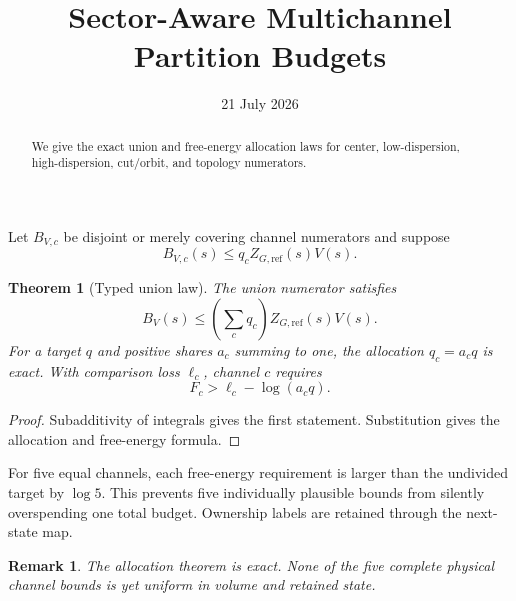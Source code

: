 \documentclass[11pt]{article}\usepackage[margin=1in]{geometry}\usepackage{amsmath,amsthm}\newtheorem{theorem}{Theorem}\newtheorem{remark}{Remark}
\title{Sector-Aware Multichannel Partition Budgets}\author{}\date{21 July 2026}
\begin{document}
\maketitle
\begin{abstract}We give the exact union and free-energy allocation laws for center, low-dispersion, high-dispersion, cut/orbit, and topology numerators.\end{abstract}
Let $B_{V,c}$ be disjoint or merely covering channel numerators and suppose
\[B_{V,c}(s)\le q_c Z_{G,\mathrm{ref}}(s)V(s).
\]
\begin{theorem}[Typed union law]The union numerator satisfies
\[B_V(s)\le\left(\sum_cq_c\right)Z_{G,\mathrm{ref}}(s)V(s).
\]
For a target $q$ and positive shares $a_c$ summing to one, the allocation $q_c=a_cq$ is exact. With comparison loss $\ell_c$, channel $c$ requires
\[F_c>\ell_c-\log(a_cq).
\]\end{theorem}
\begin{proof}Subadditivity of integrals gives the first statement. Substitution gives the allocation and free-energy formula.\end{proof}
For five equal channels, each free-energy requirement is larger than the undivided target by $\log5$. This prevents five individually plausible bounds from silently overspending one total budget. Ownership labels are retained through the next-state map.
\begin{remark}The allocation theorem is exact. None of the five complete physical channel bounds is yet uniform in volume and retained state.\end{remark}
\end{document}
